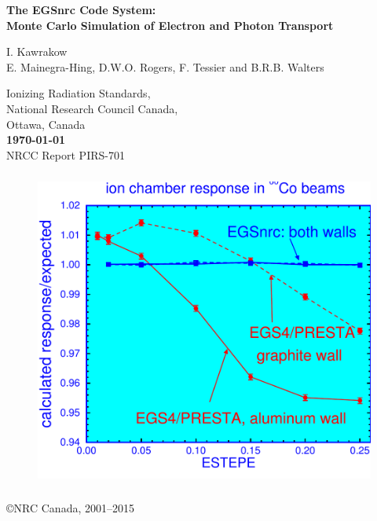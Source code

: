 \documentclass[12pt,twoside]{article}  %
\newcommand{\cen}[1]{\begin{center} #1 \end{center} }
\begin{document}
\begin{center}
{\sffamily \bfseries {\Huge The EGSnrc Code System:}\\
{\Large Monte Carlo Simulation of Electron and Photon Transport
\vspace{5mm}\\}}
\begin{large}
I. Kawrakow\\
E. Mainegra-Hing, D.W.O. Rogers, F. Tessier and B.R.B. Walters\\
\end{large}
Ionizing Radiation Standards,\\
National Research Council Canada,\\
Ottawa, Canada\\

\vspace{10mm}
{\bfseries
\today}
\vspace{5mm}\\
\hfill NRCC Report {\sf PIRS-701} \vspace*{15mm}\\


\begin{figure}[h]
\begin{center}
\leavevmode
\includegraphics[height=10.5cm]{figures/ion_chamber}
\end{center}
\end{figure}
\vfill

\copyright NRC Canada, 2001--2015
\end{center}
\newpage   %
\mbox{}
\end{document}
